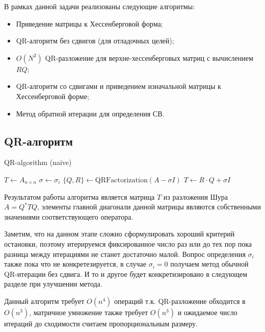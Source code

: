\documentclass[a4paper,14pt]{extarticle}
\begin{document}
В рамках данной задачи реализованы следующие алгоритмы:
\begin{itemize}
\item Приведение матрицы к Хессенберговой форма;

\item QR-алгоритм без сдвигов (для отладочных целей);

\item $O(N^2)$ QR-разложение для верхне-хессенберговых матриц с вычислением $RQ$;

\item QR-алгоритм со сдвигами и приведением изначальной матрицы к Хессенберговой форме;

\item Метод обратной итерации для определения СВ.
\end{itemize}

\subsection{QR-алгоритм}

\begin{algorithm}[H]
\caption{QR-algorithm (naive)}
\vspace{4pt}
$T \gets A_{n \times n}$\;
 {
	$\sigma \gets \sigma_i$\;
	$\lbrace Q, R \rbrace \gets \mathrm{QRFactorization}(A - \sigma I)$\;
	$T \gets R \cdot Q + \sigma I$\;
}
\end{algorithm}
\vspace{8pt}

Результатом работы алгоритма является матрица $T$ из разложения Шура $A = Q^* T Q$, элементы главной диагонали данной матрицы являются собственными значениями соответствующего оператора.

Заметим, что на данном этапе сложно сформулировать хороший критерий остановки, поэтому итерируемся фиксированное число раз или до тех пор пока разница между итерациями не станет достаточно малой. Вопрос определения $\sigma_i$ также пока что не конкретезируется, в случае $\sigma_i = 0$ получаем метод обычной QR-итерации без сдвига. И то и другое будет конкретизировано в следующем разделе при улучшении метода.

Данный алгоритм требует $O(n^4)$ операций т.к. QR-разложение обходится в $O(n^3)$, матричное умножение также требует $O(n^3)$ и ожидаемое число итераций до сходимости считаем пропорциональным размеру.
\end{document}
